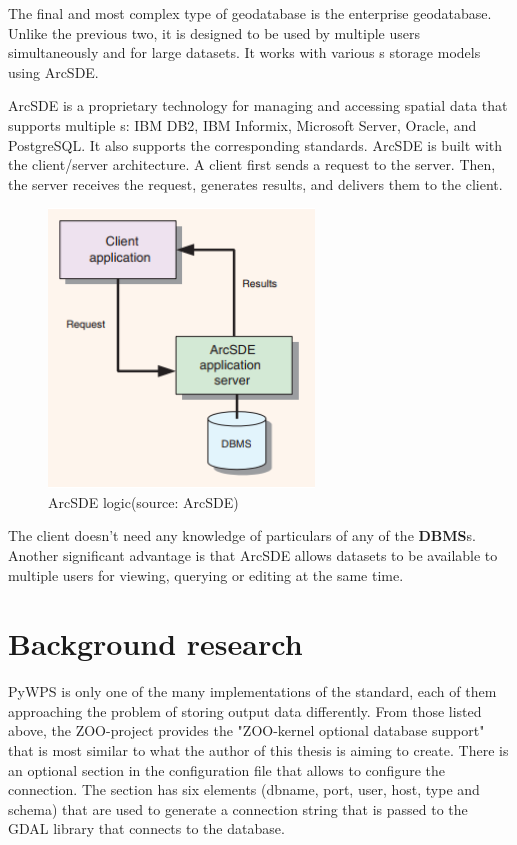 The final and most complex type of geodatabase is the enterprise
geodatabase. Unlike the previous two, it is designed to be used by
multiple users simultaneously and for large datasets. It works with
various s storage models using ArcSDE.

ArcSDE is a proprietary technology for managing and accessing spatial
data that supports multiple s: IBM DB2, IBM Informix, Microsoft 
Server, Oracle, and PostgreSQL.\cite{arcsdedoc} It also supports the
corresponding standards. ArcSDE is built with the client/server
architecture. A client first sends a request to the server. Then, the
server receives the request, generates results, and delivers them to
the client.

\begin{figure}[H] \centering
      \includegraphics[width=200pt]{./pictures/arcsdeobr.png}
      \caption[ArcSDE logic]{ArcSDE logic(source: ArcSDE)}
      \label{fig:ArcSDE logic}
  \end{figure}

The client doesn't need any knowledge of particulars of any of the
\textbf{DBMS}s. Another significant advantage is that ArcSDE allows datasets to
be available to multiple users for viewing, querying or editing at the
same time.\cite{esritypes}

\section{Background research}


PyWPS is only one of the many implementations of the standard,
each of them approaching the problem of storing output data
differently. From those listed above, the ZOO-project provides the
"ZOO-kernel optional database support" \cite{zoodb} that is most
similar to what the author of this thesis is aiming to create. There
is an optional section in the configuration file that allows to
configure the connection. The section has six elements (dbname, port,
user, host, type and schema) that are used to generate a connection
string that is passed to the GDAL library that connects to the
database.\cite{zoodbsec}

